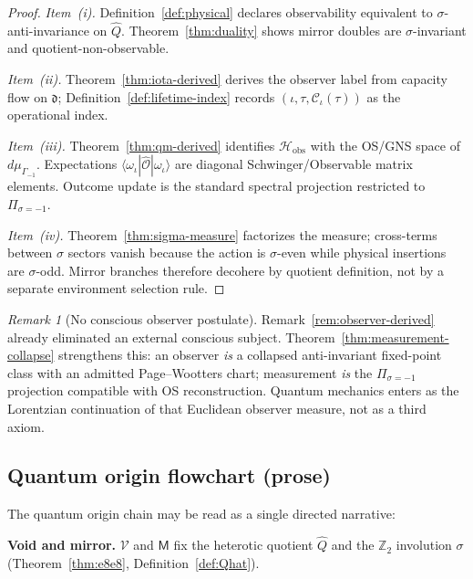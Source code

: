 \documentclass[11pt]{article}
\theoremstyle{plain}
\theoremstyle{definition}
\theoremstyle{remark}
\newtheorem{remark}[theorem]{Remark}
\numberwithin{equation}{section}
\newcommand{\Void}{\mathcal{V}}
\newcommand{\Mirror}{\mathsf{M}}
\newcommand{\capacity}{\mathcal{C}}
\begin{document}
\begin{proof}
\emph{Item~(i).} Definition~\ref{def:physical} declares observability
equivalent to $\sigma$-anti-invariance on $\hat Q$. Theorem~\ref{thm:duality}
shows mirror doubles are $\sigma$-invariant and quotient-non-observable.

\emph{Item~(ii).} Theorem~\ref{thm:iota-derived} derives the observer label
from capacity flow on $\mathfrak{d}$; Definition~\ref{def:lifetime-index}
records $(\iota,\tau,\capacity_\iota(\tau))$ as the operational index.

\emph{Item~(iii).} Theorem~\ref{thm:qm-derived} identifies
$\mathcal{H}_{\mathrm{obs}}$ with the OS/GNS space of
$d\mu_{\Gamma_{-1}}$. Expectations $\langle\omega_\iota|\hat{\mathcal{O}}|\omega_\iota\rangle$
are diagonal Schwinger/Observable matrix elements. Outcome update is the
standard spectral projection restricted to $\Pi_{\sigma=-1}$.

\emph{Item~(iv).} Theorem~\ref{thm:sigma-measure} factorizes the measure;
cross-terms between $\sigma$ sectors vanish because the action is
$\sigma$-even while physical insertions are $\sigma$-odd. Mirror branches
therefore decohere by quotient definition, not by a separate environment
selection rule.
\end{proof}

\begin{remark}[No conscious observer postulate]
Remark~\ref{rem:observer-derived} already eliminated an external conscious
subject. Theorem~\ref{thm:measurement-collapse} strengthens this: an observer
\emph{is} a collapsed anti-invariant fixed-point class with an admitted
Page--Wootters chart; measurement \emph{is} the $\Pi_{\sigma=-1}$ projection
compatible with OS reconstruction. Quantum mechanics enters as the
Lorentzian continuation of that Euclidean observer measure, not as a third
axiom.
\end{remark}

\subsection{Quantum origin flowchart (prose)}

The quantum origin chain may be read as a single directed narrative:

\medskip
\noindent\textbf{Void and mirror.}
$\Void$ and $\Mirror$ fix the heterotic quotient $\hat Q$ and the
$\mathbb{Z}_2$ involution $\sigma$ (Theorem~\ref{thm:e8e8},
Definition~\ref{def:Qhat}).
\end{document}
